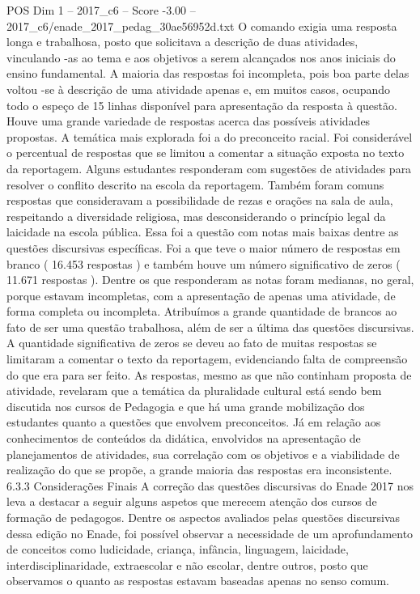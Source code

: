 \begin{textsample}{POS Dim 1 – 2017\_c6 – Score -3.00 – 2017\_c6/enade\_2017\_pedag\_30ae56952d.txt}
O comando exigia uma resposta longa e trabalhosa, posto que solicitava a descrição de duas atividades, vinculando -as ao tema e aos objetivos a serem alcançados nos anos iniciais do ensino fundamental.
A maioria das respostas foi incompleta, pois boa parte delas voltou -se à descrição de uma atividade apenas e, em muitos casos, ocupando todo o espeço de 15 linhas disponível para apresentação da resposta à questão.
Houve uma grande variedade de respostas acerca das possíveis atividades propostas.
A temática mais explorada foi a do preconceito racial.
Foi considerável o percentual de respostas que se limitou a comentar a situação exposta no texto da reportagem.
Alguns estudantes responderam com sugestões de atividades para resolver o conflito descrito na escola da reportagem.
Também foram comuns respostas que consideravam a possibilidade de rezas e orações na sala de aula, respeitando a diversidade religiosa, mas desconsiderando o princípio legal da laicidade na escola pública.
Essa foi a questão com notas mais baixas dentre as questões discursivas específicas.
Foi a que teve o maior número de respostas em branco ( 16.453 respostas ) e também houve um número significativo de zeros ( 11.671 respostas ).
Dentre os que responderam as notas foram medianas, no geral, porque estavam incompletas, com a apresentação de apenas uma atividade, de forma completa ou incompleta.
Atribuímos a grande quantidade de brancos ao fato de ser uma questão trabalhosa, além de ser a última das questões discursivas.
A quantidade significativa de zeros se deveu ao fato de muitas respostas se limitaram a comentar o texto da reportagem, evidenciando falta de compreensão do que era para ser feito.
As respostas, mesmo as que não continham proposta de atividade, revelaram que a temática da pluralidade cultural está sendo bem discutida nos cursos de Pedagogia e que há uma grande mobilização dos estudantes quanto a questões que envolvem preconceitos.
Já em relação aos conhecimentos de conteúdos da didática, envolvidos na apresentação de planejamentos de atividades, sua correlação com os objetivos e a viabilidade de realização do que se propõe, a grande maioria das respostas era inconsistente. 6.3.3 Considerações Finais A correção das questões discursivas do Enade 2017 nos leva a destacar a seguir alguns aspetos que merecem atenção dos cursos de formação de pedagogos.
Dentre os aspectos avaliados pelas questões discursivas dessa edição no Enade, foi possível observar a necessidade de um aprofundamento de conceitos como ludicidade, criança, infância, linguagem, laicidade, interdisciplinaridade, extraescolar e não escolar, dentre outros, posto que observamos o quanto as respostas estavam baseadas apenas no senso comum.

\end{textsample}

